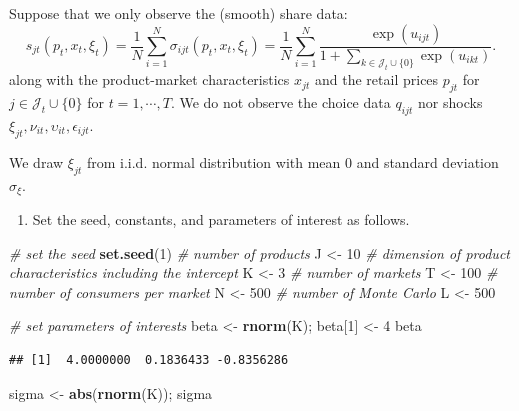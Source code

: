 \documentclass[]{book}
\newenvironment{Shaded}{\begin{snugshade}}{\end{snugshade}}
\newcommand{\KeywordTok}[1]{\textcolor[rgb]{0.13,0.29,0.53}{\textbf{#1}}}
\newcommand{\DecValTok}[1]{\textcolor[rgb]{0.00,0.00,0.81}{#1}}
\newcommand{\StringTok}[1]{\textcolor[rgb]{0.31,0.60,0.02}{#1}}
\newcommand{\CommentTok}[1]{\textcolor[rgb]{0.56,0.35,0.01}{\textit{#1}}}
\newcommand{\NormalTok}[1]{#1}
\providecommand{\tightlist}{%
  \setlength{\itemsep}{0pt}\setlength{\parskip}{0pt}}
\begin{document}
Suppose that we only observe the (smooth) share data: \[
s_{jt}(p_t, x_t, \xi_t) = \frac{1}{N} \sum_{i = 1}^N \sigma_{ijt}(p_t, x_t, \xi_t) = \frac{1}{N} \sum_{i = 1}^N \frac{\exp(u_{ijt})}{1 + \sum_{k \in \mathcal{J}_t \cup \{0\}} \exp(u_{ikt})}. 
\] along with the product-market characteristics \(x_{jt}\) and the
retail prices \(p_{jt}\) for \(j \in \mathcal{J}_t \cup \{0\}\) for
\(t = 1, \cdots, T\). We do not observe the choice data \(q_{ijt}\) nor
shocks \(\xi_{jt}, \nu_{it}, \upsilon_{it}, \epsilon_{ijt}\).

We draw \(\xi_{jt}\) from i.i.d. normal distribution with mean 0 and
standard deviation \(\sigma_{\xi}\).

\begin{enumerate}
\def\labelenumi{\arabic{enumi}.}
\tightlist
\item
  Set the seed, constants, and parameters of interest as follows.
\end{enumerate}

\begin{Shaded}
\begin{Highlighting}[]
\CommentTok{# set the seed}
\KeywordTok{set.seed}\NormalTok{(}\DecValTok{1}\NormalTok{)}
\CommentTok{# number of products}
\NormalTok{J <-}\StringTok{ }\DecValTok{10}
\CommentTok{# dimension of product characteristics including the intercept}
\NormalTok{K <-}\StringTok{ }\DecValTok{3}
\CommentTok{# number of markets}
\NormalTok{T <-}\StringTok{ }\DecValTok{100}
\CommentTok{# number of consumers per market}
\NormalTok{N <-}\StringTok{ }\DecValTok{500}
\CommentTok{# number of Monte Carlo}
\NormalTok{L <-}\StringTok{ }\DecValTok{500}
\end{Highlighting}
\end{Shaded}

\begin{Shaded}
\begin{Highlighting}[]
\CommentTok{# set parameters of interests}
\NormalTok{beta <-}\StringTok{ }\KeywordTok{rnorm}\NormalTok{(K); }
\NormalTok{beta[}\DecValTok{1}\NormalTok{] <-}\StringTok{ }\DecValTok{4}
\NormalTok{beta}
\end{Highlighting}
\end{Shaded}

\begin{verbatim}
## [1]  4.0000000  0.1836433 -0.8356286
\end{verbatim}

\begin{Shaded}
\begin{Highlighting}[]
\NormalTok{sigma <-}\StringTok{ }\KeywordTok{abs}\NormalTok{(}\KeywordTok{rnorm}\NormalTok{(K)); sigma}
\end{Highlighting}
\end{Shaded}
\end{document}
